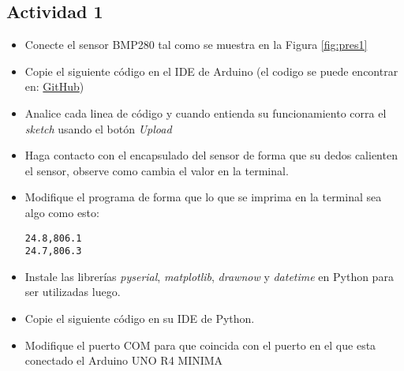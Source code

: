 \subsection{Actividad 1}
\begin{itemize}
    \item Conecte el sensor BMP280 tal como se muestra en la Figura \ref{fig:pres1}
    \item Copie el siguiente código en el IDE de Arduino (el codigo se puede encontrar en: \href{https://github.com/juanjorojash/instrumentacion_I/blob/master/algoritmos/BMP280/BMP280_lib/BMP280_lib.ino}{GitHub})
      
    \item Analice cada linea de código y cuando entienda su funcionamiento corra el \emph{sketch} usando el botón \emph{Upload}
    \item Haga contacto con el encapsulado del sensor de forma que su dedos calienten el sensor, observe como cambia el valor en la terminal. 
    \item Modifique el programa de forma que lo que se imprima en la terminal sea algo como esto:
\begin{verbatim}
24.8,806.1
24.7,806.3
\end{verbatim}
    \item Instale las librerías \emph{pyserial}, \emph{matplotlib}, \emph{drawnow} y \emph{datetime} en Python para ser utilizadas luego.
    \item Copie el siguiente código en su IDE de Python.
    
    \item Modifique el puerto COM para que coincida con el puerto en el que esta conectado el Arduino UNO R4 MINIMA
\end{itemize}

